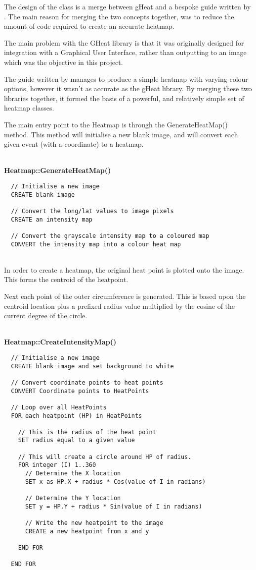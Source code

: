The design of the class is a merge between gHeat \citep{gHeat} and a bespoke 
guide written by \citeauthor{vester} \citep{vester}. The main reason for 
merging the two concepts together, was to reduce the amount of code required to
create an accurate heatmap.

The main problem with the GHeat library is that it was originally designed for 
integration with a Graphical User Interface, rather than outputting to an image 
which was the objective in this project.

The guide written by \citeauthor{vester} manages to produce a simple heatmap 
with varying colour options, however it wasn't as accurate as the gHeat 
library. By merging these two libraries together, it formed the basis of a 
powerful, and relatively simple set of heatmap classes.

The main entry point to the Heatmap is through the {\ttfamily GenerateHeatMap()}
method. This method will initialise a new blank image, and will convert each 
given event (with a coordinate) to a heatmap.

~\\
{\bfseries Heatmap::GenerateHeatMap()}
\lstset{style=pseudocode}
\begin{lstlisting}
  // Initialise a new image
  CREATE blank image

  // Convert the long/lat values to image pixels
  CREATE an intensity map
 
  // Convert the grayscale intensity map to a coloured map
  CONVERT the intensity map into a colour heat map
\end{lstlisting}

~\\
In order to create a heatmap, the original heat point is plotted onto the 
image. This forms the centroid of the heatpoint. 

Next each point of the outer circumference is generated. This is based upon the
centroid location plus a prefixed radius value multiplied by the cosine of the 
current degree of the circle.

~\\
{\bfseries Heatmap::CreateIntensityMap()}
\lstset{style=pseudocode}
\begin{lstlisting}
  // Initialise a new image
  CREATE blank image and set background to white

  // Convert coordinate points to heat points
  CONVERT Coordinate points to HeatPoints

  // Loop over all HeatPoints
  FOR each heatpoint (HP) in HeatPoints
    
    // This is the radius of the heat point 
    SET radius equal to a given value

    // This will create a circle around HP of radius.
    FOR integer (I) 1..360
      // Determine the X location
      SET x as HP.X + radius * Cos(value of I in radians)

      // Determine the Y location
      SET y = HP.Y + radius * Sin(value of I in radians)

      // Write the new heatpoint to the image 
      CREATE a new heatpoint from x and y

    END FOR

  END FOR
\end{lstlisting}
